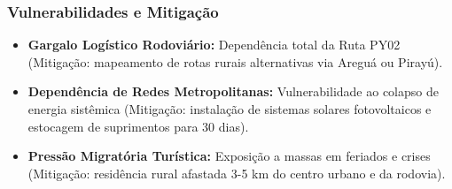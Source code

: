 \subsubsection{Vulnerabilidades e
Mitigação}

\begin{itemize}
\tightlist
\item
  \textbf{Gargalo Logístico Rodoviário:} Dependência total da Ruta PY02
  (Mitigação: mapeamento de rotas rurais alternativas via Areguá ou
  Pirayú).
\item
  \textbf{Dependência de Redes Metropolitanas:} Vulnerabilidade ao
  colapso de energia sistêmica (Mitigação: instalação de sistemas
  solares fotovoltaicos e estocagem de suprimentos para 30 dias).
\item
  \textbf{Pressão Migratória Turística:} Exposição a massas em feriados
  e crises (Mitigação: residência rural afastada 3-5 km do centro urbano
  e da rodovia).
\end{itemize}

